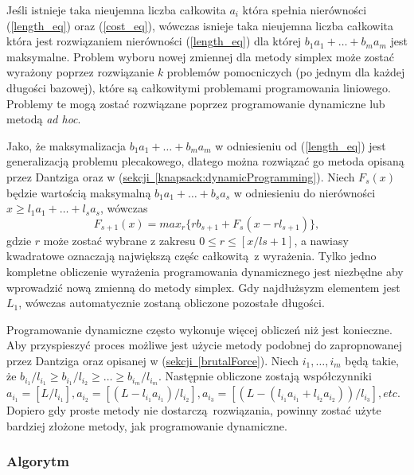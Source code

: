 Jeśli istnieje taka nieujemna liczba całkowita $a_i$ która spełnia nierówności (\ref{length_eq}) oraz (\ref{cost_eq}), wówczas isnieje taka nieujemna liczba całkowita która jest rozwiązaniem nierówności (\ref{length_eq}) dla której $b_1a_1+\dots+b_ma_m$ jest maksymalne. Problem wyboru nowej zmiennej dla metody simplex może zostać wyrażony poprzez rozwiązanie $k$ problemów pomocniczych (po jednym dla każdej długości bazowej), które są całkowitymi problemami programowania liniowego. Problemy te mogą zostać rozwiązane poprzez programowanie dynamiczne lub metodą \textit{ad hoc}.

Jako, że maksymalizacja $b_1a_1+\dots+b_ma_m$ w odniesieniu od (\ref{length_eq}) jest generalizacją problemu plecakowego, dlatego można rozwiązać go metoda opisaną przez Dantziga \cite{DantzigArticle} oraz w (\hyperref[knapsack:dynamicProgramming]{sekcji~\ref*{knapsack:dynamicProgramming}}). Niech $F_s(x)$ będzie wartością maksymalną $b_1a_1+\dots+b_sa_s$ w odniesieniu do nierówności $x \ge l_1a_1+\dots+l_sa_s$, wówczas
\begin{equation*}
  F_{s+1}(x) = max_r\{rb_{s+1}+F_s(x-rl_{s+1})\},
\end{equation*}
gdzie $r$ może zostać wybrane z zakresu $0 \le r \le [x/l{s+1}]$, a nawiasy kwadratowe oznaczają największą częśc całkowitą z wyrażenia. Tylko jedno kompletne obliczenie wyrażenia programowania dynamicznego jest niezbędne aby wprowadzić nową zmienną do metody simplex. Gdy najdłużsyzm elementem jest $L_1$, wówczas automatycznie zostaną obliczone pozostałe długości.

Programowanie dynamiczne często wykonuje więcej obliczeń niż jest konieczne. Aby przyspieszyć proces możliwe jest użycie metody podobnej do zapropnowanej przez Dantziga \cite{DantzigArticle} oraz opisanej w (\hyperref[brutalForce]{sekcji~\ref*{brutalForce}}). Niech $i_1,\dots,i_m$ będą takie, że $b_i_1/l_i_1 \ge b_i_1/l_i_2 \ge \dots \ge b_i_m/l_i_m$. Następnie obliczone zostają współczynniki $a_i_1=[L/l_i_1], a_i_2=[(L-l_i_1a_i_1)/l_i_2], a_i_3 = [(L - (l_i_1a_i_1 + l_i_2a_i_2))/l_i_3], etc$. Dopiero gdy proste metody nie dostarczą rozwiązania, powinny zostać użyte bardziej złożone metody, jak programowanie dynamiczne.

\subsubsection{Algorytm}

